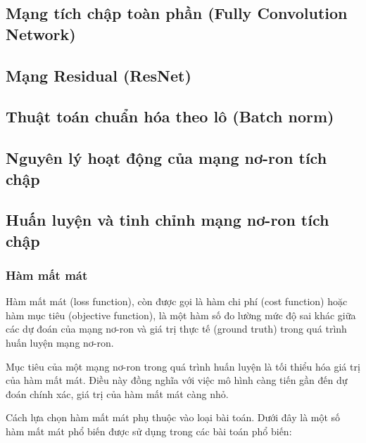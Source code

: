 \subsection{Mạng tích chập toàn phần (Fully Convolution Network)}
\subsection{Mạng Residual (ResNet)}

\subsection{Thuật toán chuẩn hóa theo lô (Batch norm)}

\subsection{Nguyên lý hoạt động của mạng nơ-ron tích chập}

\subsection{Huấn luyện và tinh chỉnh mạng nơ-ron tích chập}
\subsubsection{Hàm mất mát}
Hàm mất mát (loss function), còn được gọi là hàm chi phí (cost function) hoặc hàm mục tiêu (objective function), là một hàm số đo lường mức độ sai khác giữa các dự đoán của mạng nơ-ron và giá trị thực tế (ground truth) trong quá trình huấn luyện mạng nơ-ron.

Mục tiêu của một mạng nơ-ron trong quá trình huấn luyện là tối thiểu hóa giá trị của hàm mất mát. Điều này đồng nghĩa với việc mô hình càng tiến gần đến dự đoán chính xác, giá trị của hàm mất mát càng nhỏ.

Cách lựa chọn hàm mất mát phụ thuộc vào loại bài toán. Dưới đây là một số hàm mất mát phổ biến được sử dụng trong các bài toán phổ biến:

